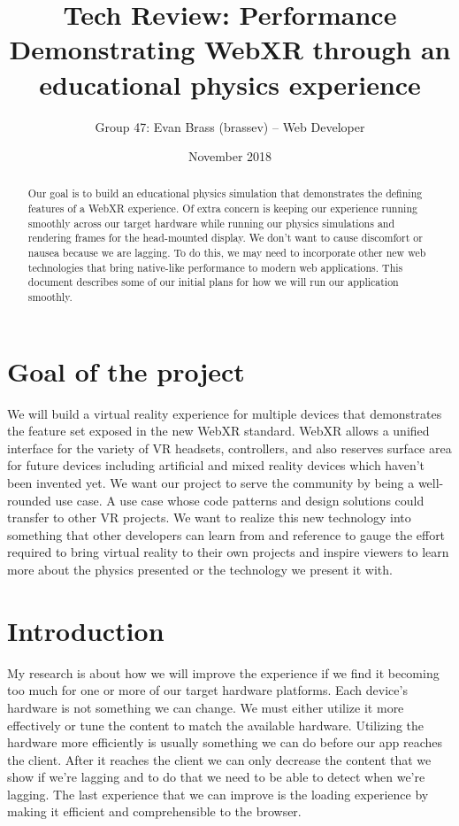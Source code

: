 \documentclass[draftclsnofoot,onecolumn]{IEEEtran}
\title{Tech Review: Performance \\
    \large Demonstrating WebXR through an educational physics experience}
\author{Group 47: Evan Brass (brassev) – Web Developer}
\date{November 2018}
\begin{document}
\maketitle

\begin{abstract}
Our goal is to build an educational physics simulation that demonstrates the defining features of a WebXR experience.  Of extra concern is keeping our experience running smoothly across our target hardware while running our physics simulations and rendering frames for the head-mounted display.  We don’t want to cause discomfort or nausea because we are lagging.  To do this, we may need to incorporate other new web technologies that bring native-like performance to modern web applications.  This document describes some of our initial plans for how we will run our application smoothly.
\end{abstract}

\section{Goal of the project}
We will build a virtual reality experience for multiple devices that demonstrates the feature set exposed in the new WebXR standard.  WebXR allows a unified interface for the variety of VR headsets, controllers, and also reserves surface area for future devices including artificial and mixed reality devices which haven’t been invented yet.  We want our project to serve the community by being a well-rounded use case.  A use case whose code patterns and design solutions could transfer to other VR projects.  We want to realize this new technology into something that other developers can learn from and reference to gauge the effort required to bring virtual reality to their own projects and inspire viewers to learn more about the physics presented or the technology we present it with.
\section{Introduction}
My research is about how we will improve the experience if we find it becoming too much for one or more of our target hardware platforms.  Each device's hardware is not something we can change.  We must either utilize it more effectively or tune the content to match the available hardware.  Utilizing the hardware more efficiently is usually something we can do before our app reaches the client.  After it reaches the client we can only decrease the content that we show if we're lagging and to do that we need to be able to detect when we're lagging.  The last experience that we can improve is the loading experience by making it efficient and comprehensible to the browser.
\end{document}
